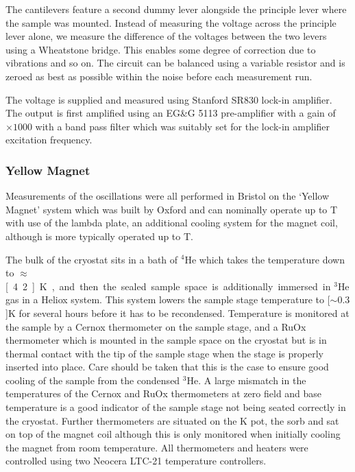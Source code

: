 The cantilevers feature a second dummy lever alongside the principle lever where the sample was mounted. Instead of measuring the voltage across the principle lever alone, we measure the difference of the voltages between the two levers using a Wheatstone bridge. This enables some degree of correction due to vibrations and so on. The circuit can be balanced using a variable resistor and is zeroed as best as possible within the noise before each measurement run.

The voltage is supplied and measured using Stanford SR830 lock-in amplifier. The output is first amplified using an EG\&G 5113 pre-amplifier with a gain of $\times1000$ with a band pass filter which was suitably set for the lock-in amplifier excitation frequency.

\subsubsection{Yellow Magnet}

Measurements of the oscillations were all performed in Bristol on the `Yellow Magnet' system which was built by Oxford and can nominally operate up to \unit[20]{T} with use of the lambda plate, an additional cooling system for the magnet coil, although is more typically operated up to \unit[18]{T}.

The bulk of the cryostat sits in a bath of $^4$He which takes the temperature down to $\approx$\unit[4.2]{K}, and then the sealed sample space is additionally immersed in $^3$He gas in a Heliox system. This system lowers the sample stage temperature to \unit[$\sim0.3$]{K} for several hours before it has to be recondensed. Temperature is monitored at the sample by a Cernox thermometer on the sample stage, and a RuOx thermometer which is mounted in the sample space on the cryostat but is in thermal contact with the tip of the sample stage when the stage is properly inserted into place. Care should be taken that this is the case to ensure good cooling of the sample from the condensed $^3$He. A large mismatch in the temperatures of the Cernox and RuOx thermometers at zero field and base temperature is a good indicator of the sample stage not being seated correctly in the cryostat. Further thermometers are situated on the \unit[1]{K} pot, the sorb and sat on top of the magnet coil although this is only monitored when initially cooling the magnet from room temperature. All thermometers and heaters were controlled using two Neocera LTC-21 temperature controllers.

